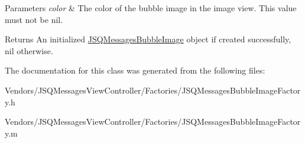 \begin{DoxyParams}{Parameters}
{\em color} & The color of the bubble image in the image view. This value must not be {\ttfamily nil}.\\
\hline
\end{DoxyParams}
\begin{DoxyReturn}{Returns}
An initialized {\ttfamily \hyperlink{interface_j_s_q_messages_bubble_image}{J\+S\+Q\+Messages\+Bubble\+Image}} object if created successfully, {\ttfamily nil} otherwise. 
\end{DoxyReturn}


The documentation for this class was generated from the following files\+:\begin{DoxyCompactItemize}
\item 
Vendors/\+J\+S\+Q\+Messages\+View\+Controller/\+Factories/J\+S\+Q\+Messages\+Bubble\+Image\+Factory.\+h\item 
Vendors/\+J\+S\+Q\+Messages\+View\+Controller/\+Factories/J\+S\+Q\+Messages\+Bubble\+Image\+Factory.\+m\end{DoxyCompactItemize}

